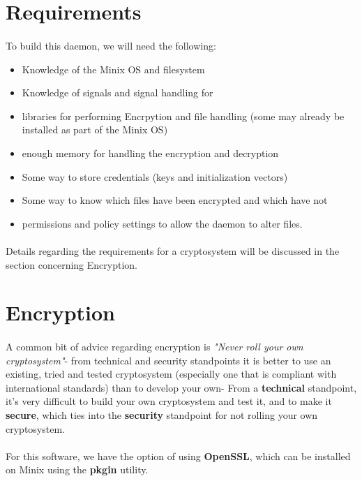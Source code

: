 \documentclass{article}
\begin{document}
\section{Requirements}
    \paragraph{}To build this daemon, we will need the following:
    \begin{itemize}
        \item Knowledge of the Minix OS and filesystem
        \item Knowledge of signals and signal handling for
        \item libraries for performing Encrpytion and file handling (some may already be installed as part of the Minix OS)
        \item enough memory for handling the encryption and decryption
        \item Some way to store credentials (keys and initialization vectors)
        \item Some way to know which files have been encrypted and which have not
        \item permissions and policy settings to allow the daemon to alter files.
    \end{itemize}
    \paragraph{}Details regarding the requirements for a cryptosystem will be discussed in the section concerning Encryption.

\section{Encryption}
    \paragraph{}A common bit of advice regarding encryption is \textit{"Never roll your own cryptosystem"}- from technical and security standpoints it is better to use an existing, tried and tested cryptosystem (especially one that is compliant with international standards) than to develop your own- From a \textbf{technical} standpoint, it's very difficult to build your own cryptosystem and test it, and to make it \textbf{secure}, which ties into the \textbf{security} standpoint for not rolling your own cryptosystem.
    
    \paragraph{}For this software, we have the option of using \textbf{OpenSSL}, which can be installed on Minix using the \textbf{pkgin} utility.
    
\end{document}
